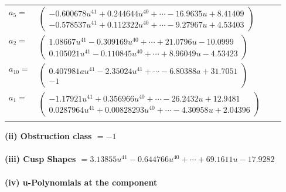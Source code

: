 \documentclass[1p]{elsarticle_modified}
\theoremstyle{definition}
\begin{document}
\begin{tabular}{m{7pt} m{180pt} m{7pt} m{180pt} }
\flushright $a_{5}=$&$\begin{pmatrix}-0.600678 u^{41}+0.244644 u^{40}+\cdots-16.9635 u+8.41409\\-0.578537 u^{41}+0.112322 u^{40}+\cdots-9.27967 u+4.53403\end{pmatrix}$ \\
\flushright $a_{2}=$&$\begin{pmatrix}1.08667 u^{41}-0.309169 u^{40}+\cdots+21.0796 u-10.0999\\0.105021 u^{41}-0.110845 u^{40}+\cdots+8.96049 u-4.53423\end{pmatrix}$ \\
\flushright $a_{10}=$&$\begin{pmatrix}0.407981 a u^{41}-2.35024 u^{41}+\cdots-6.80388 a+31.7051\\-1\end{pmatrix}$ \\
\flushright $a_{1}=$&$\begin{pmatrix}-1.17921 u^{41}+0.356966 u^{40}+\cdots-26.2432 u+12.9481\\0.0287964 u^{41}+0.00828293 u^{40}+\cdots-4.30958 u+2.04396\end{pmatrix}$\\&\end{tabular}
\flushleft \textbf{(ii) Obstruction class $= -1$}\\~\\
\flushleft \textbf{(iii) Cusp Shapes $= 3.13855 u^{41}-0.644766 u^{40}+\cdots+69.1611 u-17.9282$}\\~\\
\newpage\renewcommand{\arraystretch}{1}
\flushleft \textbf{(iv) u-Polynomials at the component}\newline \\
\end{document}
